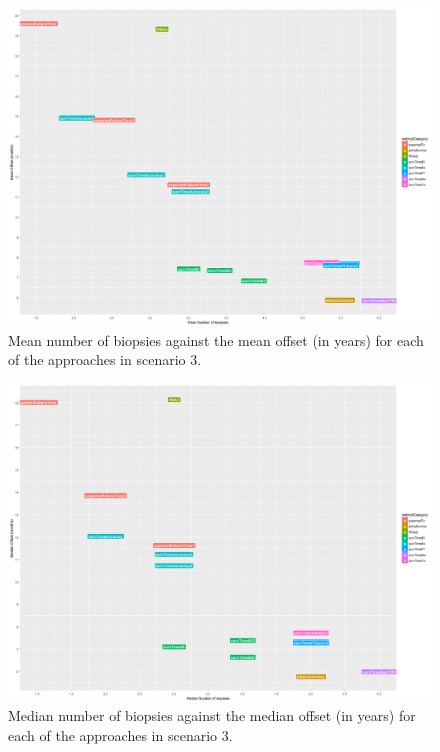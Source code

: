 \begin{figure}[H]
\centering
\captionsetup{justification=centering}
\includegraphics[width=\textwidth]{sim_study_res_sc_8pt5_sh_3/mean_offsetvsnb.png}
\caption{\label{fig : sc_8pt5_sh_3_mean_offsetvsnb} Mean number of biopsies against the mean offset (in years) for each of the approaches in scenario 3.}
\end{figure}

\begin{figure}[H]
\centering
\captionsetup{justification=centering}
\includegraphics[width=\textwidth]{sim_study_res_sc_8pt5_sh_3/median_offsetvsnb.png}
\caption{\label{fig : sc_8pt5_sh_3_median_offsetvsnb}Median number of biopsies against the median offset (in years) for each of the approaches in scenario 3.}
\end{figure}

